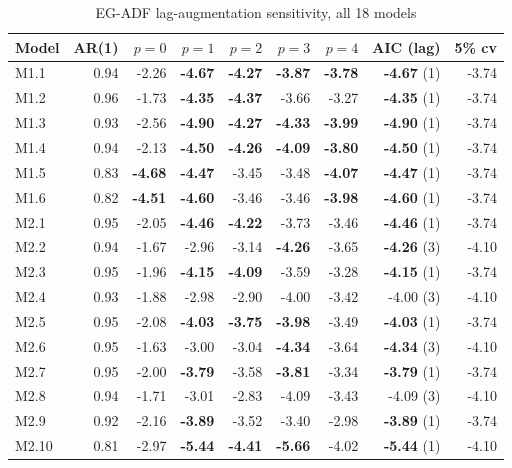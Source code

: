 \documentclass[11pt,a4paper]{article}
\begin{document}
\begin{table}[H]\centering\caption{EG-ADF lag-augmentation sensitivity, all 18 models}\label{tab:adfsens}
\small\begin{tabular}{lrrrrrrrr}
\toprule
Model & AR(1) & $p{=}0$ & $p{=}1$ & $p{=}2$ & $p{=}3$ & $p{=}4$ & AIC (lag) & 5\% cv \\
\midrule
M1.1 & 0.94 & -2.26 & \textbf{-4.67} & \textbf{-4.27} & \textbf{-3.87} & \textbf{-3.78} & \textbf{-4.67} (1) & -3.74 \\
M1.2 & 0.96 & -1.73 & \textbf{-4.35} & \textbf{-4.37} & -3.66 & -3.27 & \textbf{-4.35} (1) & -3.74 \\
M1.3 & 0.93 & -2.56 & \textbf{-4.90} & \textbf{-4.27} & \textbf{-4.33} & \textbf{-3.99} & \textbf{-4.90} (1) & -3.74 \\
M1.4 & 0.94 & -2.13 & \textbf{-4.50} & \textbf{-4.26} & \textbf{-4.09} & \textbf{-3.80} & \textbf{-4.50} (1) & -3.74 \\
M1.5 & 0.83 & \textbf{-4.68} & \textbf{-4.47} & -3.45 & -3.48 & \textbf{-4.07} & \textbf{-4.47} (1) & -3.74 \\
M1.6 & 0.82 & \textbf{-4.51} & \textbf{-4.60} & -3.46 & -3.46 & \textbf{-3.98} & \textbf{-4.60} (1) & -3.74 \\
M2.1 & 0.95 & -2.05 & \textbf{-4.46} & \textbf{-4.22} & -3.73 & -3.46 & \textbf{-4.46} (1) & -3.74 \\
M2.2 & 0.94 & -1.67 & -2.96 & -3.14 & \textbf{-4.26} & -3.65 & \textbf{-4.26} (3) & -4.10 \\
M2.3 & 0.95 & -1.96 & \textbf{-4.15} & \textbf{-4.09} & -3.59 & -3.28 & \textbf{-4.15} (1) & -3.74 \\
M2.4 & 0.93 & -1.88 & -2.98 & -2.90 & -4.00 & -3.42 & -4.00 (3) & -4.10 \\
M2.5 & 0.95 & -2.08 & \textbf{-4.03} & \textbf{-3.75} & \textbf{-3.98} & -3.49 & \textbf{-4.03} (1) & -3.74 \\
M2.6 & 0.95 & -1.63 & -3.00 & -3.04 & \textbf{-4.34} & -3.64 & \textbf{-4.34} (3) & -4.10 \\
M2.7 & 0.95 & -2.00 & \textbf{-3.79} & -3.58 & \textbf{-3.81} & -3.34 & \textbf{-3.79} (1) & -3.74 \\
M2.8 & 0.94 & -1.71 & -3.01 & -2.83 & -4.09 & -3.43 & -4.09 (3) & -4.10 \\
M2.9 & 0.92 & -2.16 & \textbf{-3.89} & -3.52 & -3.40 & -2.98 & \textbf{-3.89} (1) & -3.74 \\
M2.10 & 0.81 & -2.97 & \textbf{-5.44} & \textbf{-4.41} & \textbf{-5.66} & -4.02 & \textbf{-5.44} (1) & -4.10 \\

\end{tabular}
\end{table}
\end{document}
